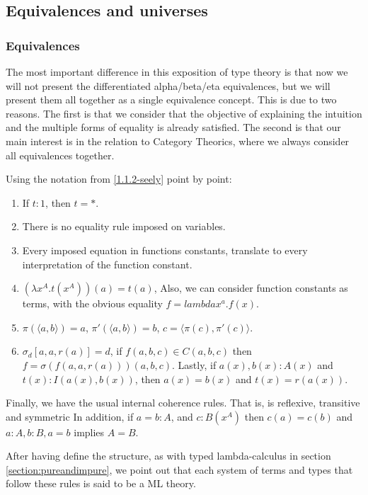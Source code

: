 \subsection{Equivalences and universes}
\subsubsection{Equivalences}

The most important difference in this exposition of type theory is that now we will not present the differentiated alpha/beta/eta equivalences, but we will present them all together as a single equivalence concept. This is due to two reasons. The first is that we consider that the objective of explaining the intuition and the multiple forms of equality is already satisfied. The second is that our main interest is in the relation to Category Theorics, where we always consider all equivalences together.


\begin{definition}
  Using the notation from \ref{1.1.2-seely} point by point:
  \begin{enumerate}
  \item If $t:1$, then $t=*$.
  \item There is no equality rule imposed on variables.
  \item Every imposed equation in functions constants, translate to every interpretation of the function constant.
  \item $(\lambda x^A.t(x^A))(a) =  t(a)$, Also, we can consider function constants as terms, with the obvious equality $f = lambda x^a.f(x)$.
  \item $\pi(\langle a,b\rangle) = a$,  $\pi'(\langle a, b\rangle) = b$, $c=\langle \pi(c),\pi'(c)\rangle$.
  \item $\sigma_d[a,a,r(a)]=d$, if $f(a,b,c)\in C(a,b,c)$ then $f=\sigma(f(a,a,r(a)))(a,b,c)$. Lastly, if $a(x), b(x):A(x)$ and $t(x) : I(a(x),b(x))$, then $a(x)=b(x)$ and $t(x)=r(a(x))$.
  \end{enumerate}

  Finally, we have the  usual internal coherence rules. That is, is reflexive, transitive and symmetric In addition, if $a=b : A$, and $c:B(x^A)$ then $c(a)=c(b)$ and $a:A, b:B, a=b$ implies $A=B$.
\end{definition}

\begin{remark}
  After having define the structure, as with typed lambda-calculus in section \ref{section:pureandimpure}, we point out that each system of terms and types that follow these rules is said to be a ML theory. 
\end{remark}
